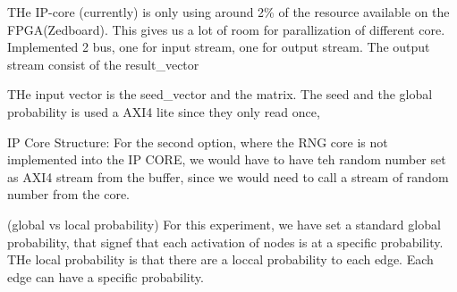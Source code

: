 THe IP-core (currently) is only using around 2\% of the resource available on the FPGA(Zedboard). This gives us a lot of room for parallization of different core. Implemented 2 bus, one for input stream, one for output stream. The output stream consist of the result_vector

THe input vector is the seed_vector and the matrix. The seed and the global probability is used a AXI4 lite since they only read once, 


IP Core Structure:
For the second option, where the RNG core is not implemented into the IP CORE, we would have to have teh random number set as AXI4 stream from the buffer, since we would need to call a stream of random number from the core.


(global vs local probability)
For this experiment, we have set a standard global probability, that signef that each activation of nodes is at a specific probability. THe local probability is that there are a loccal probability to each edge. Each edge can have a specific probability.